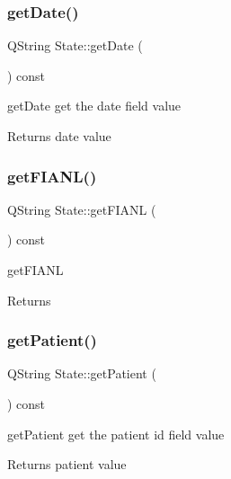 \subsubsection{\texorpdfstring{getDate()}{getDate()}}
{\footnotesize\ttfamily Q\+String State\+::get\+Date (\begin{DoxyParamCaption}{ }\end{DoxyParamCaption}) const}



get\+Date get the date field value 

\begin{DoxyReturn}{Returns}
date value 
\end{DoxyReturn}
\mbox{\label{class_state_a5b4cc8d273139472dead50c12c3aef3f}} 
\subsubsection{\texorpdfstring{getFIANL()}{getFIANL()}}
{\footnotesize\ttfamily Q\+String State\+::get\+F\+I\+A\+NL (\begin{DoxyParamCaption}{ }\end{DoxyParamCaption}) const}



get\+F\+I\+A\+NL 

\begin{DoxyReturn}{Returns}

\end{DoxyReturn}
\mbox{\label{class_state_a7743f5db2b54ebf32d8a319b665bccda}} 
\subsubsection{\texorpdfstring{getPatient()}{getPatient()}}
{\footnotesize\ttfamily Q\+String State\+::get\+Patient (\begin{DoxyParamCaption}{ }\end{DoxyParamCaption}) const}



get\+Patient get the patient id field value 

\begin{DoxyReturn}{Returns}
patient value 
\end{DoxyReturn}
\mbox{\label{class_state_a2b63ae87a83465d6f8fae8c2ad109c15}} 
